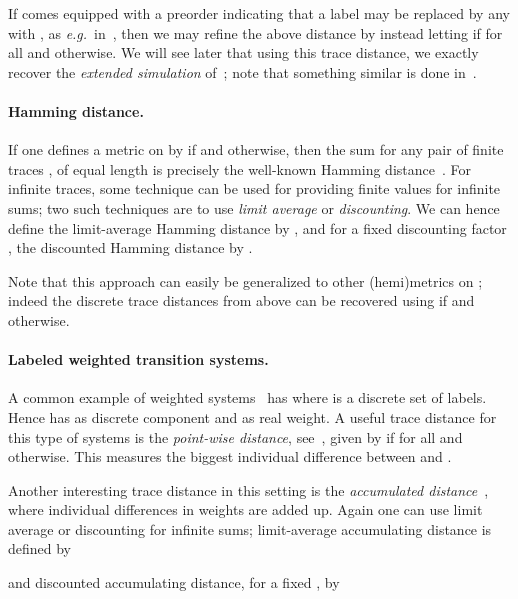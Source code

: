 \documentclass[copyright,creativecommons,sharealike]{eptcs}
\theoremstyle{plain}
\newcommand*\eg{\textit{e.g.}}
\begin{document}
If  comes equipped with a preorder  indicating that a label  may be replaced by any
 with , as \eg~in~\cite{Thomsen87}, then we
may refine the above distance by instead letting  if  for all  and  otherwise.  We will see later that using this trace
distance, we exactly recover the \emph{extended simulation}
of~\cite{Thomsen87}; note that something similar is done
in~\cite{DBLP:journals/dke/MedeirosAW08}. 

\paragraph{Hamming distance.}

If one defines a metric  on  by  if  and  otherwise, then the sum  for
any pair of finite traces ,  of equal length is
precisely the well-known Hamming distance~\cite{Hamming50}.  For
infinite traces, some technique can be used for providing finite
values for infinite sums; two such techniques are to use \emph{limit
  average} or \emph{discounting}.  We can hence define the
limit-average Hamming distance by , and for a fixed
discounting factor , the discounted Hamming distance
by .

Note that this approach can easily be generalized to other
(hemi)metrics  on ; indeed the discrete trace distances from
above can be recovered using  if  and  otherwise.

\paragraph{Labeled weighted transition systems.}
\label{ex:wlts}

A common example of weighted
systems~\cite{DBLP:conf/formats/BouyerFLMS08,conf/concur/CernyHR10,conf/csl/ChatterjeeDH08,journals/jlap/ThraneFL10,DBLP:conf/concur/Breugel05}
has  where  is a discrete set of
labels.  Hence  has  as
discrete component and  as real weight.  A useful trace
distance for this type of systems is the \emph{point-wise distance},
see~\cite{conf/icalp/AlfaroFS04,journals/jlap/ThraneFL10}, given by
 if  for all  and  otherwise.
This measures the biggest individual difference between  and
.

Another interesting trace distance in this setting is the
\emph{accumulated distance}~\cite{journals/jlap/ThraneFL10}, where
individual differences in weights are added up.  Again one can use
limit average or discounting for infinite sums; limit-average
accumulating distance is defined by

and discounted accumulating distance, for a fixed , by
\end{document}
